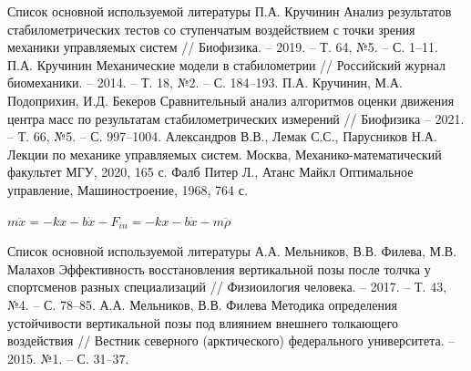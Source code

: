 \documentclass[10pt]{beamer}
\begin{document}
\begin{thebibliography}{15}
	\begin{frame}{Список основной используемой литературы}
		П.А. Кручинин Анализ результатов стабилометрических тестов со ступенчатым воздействием с точки зрения механики управляемых систем
		// Биофизика. – 2019. – Т. 64, №5. – С. 1–11.
		П.А. Кручинин Механические модели в стабилометрии // Российский журнал биомеханики. – 2014. – Т. 18, №2. – С. 184–193.
		П.А. Кручинин, М.А. Подоприхин, И.Д. Бекеров Сравнительный анализ алгоритмов оценки движения центра масс по результатам стабилометрических измерений // Биофизика – 2021. – Т. 66, №5. – С. 997–1004. 
		 Александров В.В., Лемак С.С., Парусников Н.А. Лекции по механике управляемых систем. Москва, Механико-математический факультет МГУ, 2020, 165 с.
		Фалб Питер Л., Атанс Майкл Оптимальное управление, Машиностроение, 1968, 764 с.
	\end{frame}
	$m\ddot{x}=-kx-b\dot{x}-F_{in}=-kx-b\dot{x}-m\ddot{\rho}$
	\begin{frame}{Список основной используемой литературы}
		А.А. Мельников, В.В. Филева, М.В. Малахов Эффективность восстановления вертикальной позы
		после толчка у спортсменов разных специализаций // Физиоилогия человека. – 2017. – Т. 43, №4. – С. 78–85.
		А.А. Мельников, В.В. Филева Методика определения устойчивости вертикальной позы под влиянием
		 внешнего толкающего воздействия // Вестник северного (арктического) федерального университета. – 2015. №1. – С. 31–37.
	\end{frame}

\end{thebibliography}
\end{document}
